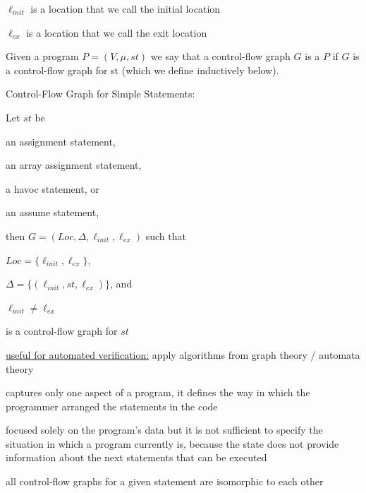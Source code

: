 \documentclass[landscape, a4paper]{article}
\begin{document}
\begin{minipage}[t]{0.2\linewidth}
\begin{betterlist}
\begin{betterlist}
\begin{betterlist}
			\end{betterlist}
			\item $\ell_{init}$ is a location that we call the \alert{initial location}
			\item $\ell_{ex}$ is a location that we call the \alert{exit location}
		\end{betterlist}\color{black}
		\item Given a program $P = (V , \mu , st)$ we say that a control-flow graph $G$ is a  $P$ if $G$ is a control-flow graph for st (which we define inductively below). 
		\begin{betterlist}
			\item \alert{Control-Flow Graph for Simple Statements}:
			\begin{betterlist}
				\item Let $st$ be
				\begin{betterlist}
					\item an assignment statement,
					\item an array assignment statement,
					\item a havoc statement, or
					\item an assume statement,
				\end{betterlist}
				then $G = (Loc, \Delta , \ell_{init}, \ell_{ex})$ such that
				\begin{betterlist}
					\item $Loc = \{ \ell_{init}, \ell_{ex}\}$,
					\item $\Delta = \{ (\ell_{init}, st, \ell_{ex})\}$, and
					\item $\ell_{init} \ne  \ell_{ex}$
				\end{betterlist}
				is a control-flow graph for $st$
			\end{betterlist}
			\item \underline{useful for automated verification:} apply algorithms from graph theory / automata theory
			\item captures only one aspect of a program, it defines the way in which the programmer arranged the statements in the code
			\item focused solely on the program’s data but it is not sufficient to specify the situation in which a program currently is, because the state does not provide information about the next statements that can be executed
			\item {}
			\item all control-flow graphs for a given statement are \alert{isomorphic} to each other

\end{betterlist}
\end{betterlist}
\end{minipage}
\end{document}
